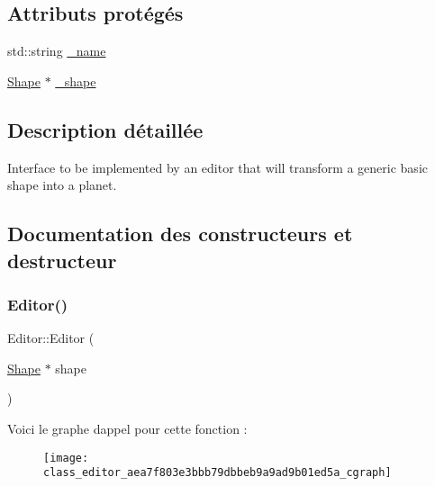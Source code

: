 \subsection*{Attributs protégés}
\begin{DoxyCompactItemize}
\item 
std\+::string \hyperlink{class_editor_a0ae04e135284b48561a538397106f42a}{\+\_\+name}
\item 
\hyperlink{class_shape}{Shape} $\ast$ \hyperlink{class_editor_ad9f31fcae91fb4a91b5ff5ecb4308bdf}{\+\_\+shape}
\end{DoxyCompactItemize}


\subsection{Description détaillée}
Interface to be implemented by an editor that will transform a generic basic shape into a planet. 

\subsection{Documentation des constructeurs et destructeur}
\mbox{\label{class_editor_aea7f803e3bbb79dbbeb9a9ad9b01ed5a}} 
\subsubsection{\texorpdfstring{Editor()}{Editor()}}
{\footnotesize\ttfamily Editor\+::\+Editor (\begin{DoxyParamCaption}\item[{\hyperlink{class_shape}{Shape} $\ast$}]{shape }\end{DoxyParamCaption})\hspace{0.3cm}{\ttfamily [inline]}}

Voici le graphe d\textquotesingle{}appel pour cette fonction \+:\nopagebreak
\begin{figure}[H]
\begin{center}
\leavevmode
\texttt{[image: class\_editor\_aea7f803e3bbb79dbbeb9a9ad9b01ed5a\_cgraph]}
\end{center}
\end{figure}
\mbox{\label{class_editor_a192c911dff4ebca89d0b1bb3aa482253}} 
